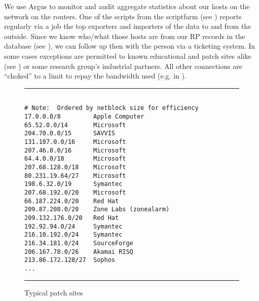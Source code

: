 We use Argus
\cite{argus,tao-net-sec-2005}
to monitor and audit aggregate
statistics about our hosts on the network on the routers. One of the scripts
from the scriptfarm (see ) reports regularly via a  job the top exporters and
importers of the data to and from the outside. Since we know who/what those
hosts are from our RP records in the database (see ), we can follow up then with
the person via a ticketing system. In some cases exceptions are permitted
to known educational and patch sites alike
(see )
or some research group's industrial partners. All other connections are ``choked''
to a limit to repay the bandwidth used (e.g. in ).

\begin{figure}[htpb!]
\hrule
\scriptsize
\begin{verbatim}

# Note:  Ordered by netblock size for efficiency
17.0.0.0/8         Apple Computer
65.52.0.0/14       Microsoft
204.70.0.0/15      SAVVIS
131.107.0.0/16     Microsoft
207.46.0.0/16      Microsoft
64.4.0.0/18        Microsoft
207.68.128.0/18    Microsoft
80.231.19.64/27    Microsoft
198.6.32.0/19      Symantec
207.68.192.0/20    Microsoft
66.187.224.0/20    Red Hat
209.87.208.0/20    Zone Labs (zonealarm)
209.132.176.0/20   Red Hat
192.92.94.0/24     Symantec
216.10.192.0/24    Symantec
216.34.181.0/24    SourceForge
206.167.78.0/26    Akamai RISQ
213.86.172.128/27  Sophos
...
\end{verbatim}
\normalsize
\hrule
\caption{Typical patch sites}
\label{fig:typical-patch-sites}
\end{figure}

